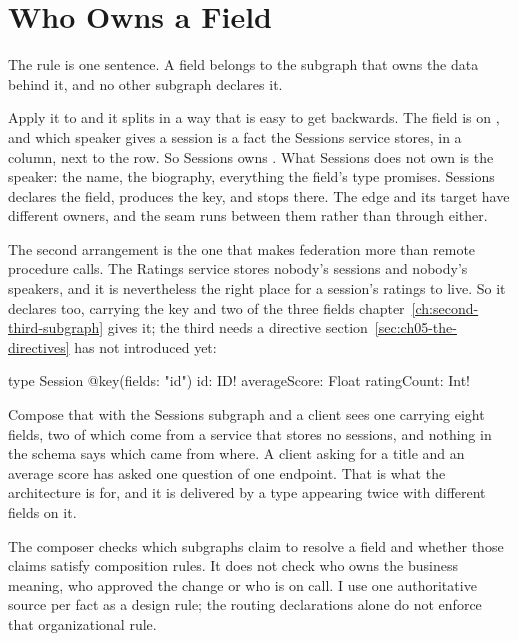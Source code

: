 \section{Who Owns a Field}
\label{sec:ch05-who-owns-a-field}

%
The rule is one sentence. A field belongs to the subgraph that owns the data
behind it, and no other subgraph declares it.

%
Apply it to  and it splits in a way that is easy to get
backwards. The field is on , and which speaker gives a session is
a fact the Sessions service stores, in a column, next to the row. So Sessions
owns . What Sessions does not own is the speaker: the name, the
biography, everything the field's type promises. Sessions declares the field,
produces the key, and stops there. The edge and its target have different
owners, and the seam runs between them rather than through either.

%
The second arrangement is the one that makes federation more than remote
procedure calls. The Ratings service stores nobody's sessions and nobody's
speakers, and it is nevertheless the right place for a session's ratings to
live. So it declares  too, carrying the key and two of the three
fields chapter~\ref{ch:second-third-subgraph} gives it; the third needs a
directive section~\ref{sec:ch05-the-directives} has not introduced yet:

\begin{graphqlsdl}
type Session @key(fields: "id") {
  id: ID!
  averageScore: Float
  ratingCount: Int!
}
\end{graphqlsdl}

%
Compose that with the Sessions subgraph and a client sees one 
carrying eight fields, two of which come from a service that stores no
sessions, and nothing in the schema says which came from where. A client asking
for a title and an average score has asked one question of one endpoint. That
is what the architecture is for, and it is delivered by a type appearing twice
with different fields on it.

%
The composer checks which subgraphs claim to resolve a field and whether
those claims satisfy composition rules. It does not check who owns the
business meaning, who approved the change or who is on call. I use one
authoritative source per fact as a design rule; the routing declarations
alone do not enforce that organizational rule.

